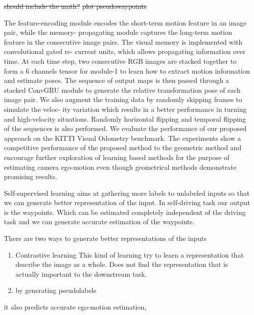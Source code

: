 \documentclass[letterpaper, 12pt]{article}
\theoremstyle{definition}
\theoremstyle{definition}
\theoremstyle{definition}
\theoremstyle{definition}
\theoremstyle{definition}
\begin{document}
\sout{should include the math?}
\sout{plot pseudowaypoints}

The feature-encoding module
encodes the short-term motion feature in an image pair, while the memory-
propagating module captures the long-term motion feature in the consecutive
image pairs. The visual memory is implemented with convolutional gated re-
current units, which allows propagating information over time. At each time
step, two consecutive RGB images are stacked together to form a 6 channels
tensor for module-1 to learn how to extract motion information and estimate
poses. The sequence of output maps is then passed through a stacked ConvGRU module to generate the relative transformation pose of each image pair. We also
augment the training data by randomly skipping frames to simulate the veloc-
ity variation which results in a better performance in turning and high-velocity
situations. Randomly horizontal flipping and temporal flipping of the sequences
is also performed. We evaluate the performance of our proposed approach on
the KITTI Visual Odometry benchmark. The experiments show a competitive
performance of the proposed method to the geometric method and encourage
further exploration of learning based methods for the purpose of estimating
camera ego-motion even though geometrical methods demonstrate promising
results.


Self-supervised learning aims at gathering more labels to unlabeled inputs so
that we can generate better representation of the input. In self-driving task
our output is the waypoints. Which can be estimated completely independent of
the driving task and we can generate accurate estimation of the waypoints.

There are two ways to generate better representations of the inputs
\begin{enumerate}
\item Contrastive learning
This kind of learning try to learn a representation that describe the image
as a whole. Does not find the representation that is actually important to
the downstream task.
\item by generating pseudolabels
\end{enumerate}


it also predicts
accurate ego-motion estimation, 
\end{document}
